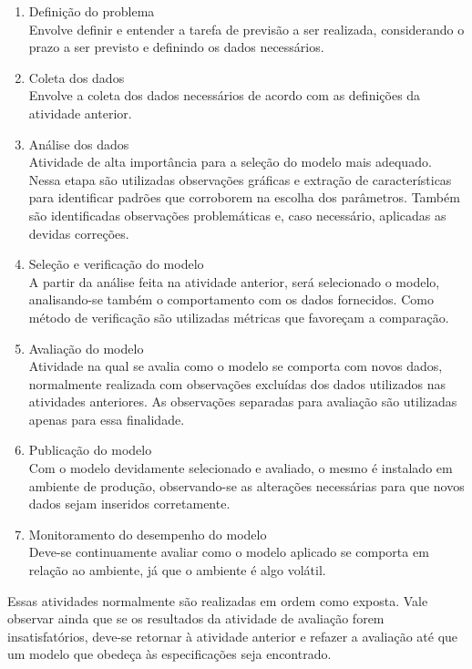\documentclass[
    12pt,
    oneside,
    a4paper,
    english,
    brazil
]{abntex2}
\begin{document}
\begin{enumerate}
    \item Definição do problema\\
        Envolve  definir e  entender  a  tarefa de  previsão  a ser  realizada,
        considerando o prazo a ser previsto e definindo os dados necessários.
    \item Coleta dos dados\\
        Envolve a coleta  dos dados necessários de acordo com  as definições da
        atividade anterior.
    \item Análise dos dados\\
        Atividade de alta  importância para a seleção do  modelo mais adequado.
        Nessa  etapa   são  utilizadas  observações  gráficas   e  extração  de
        características para identificar padrões  que corroborem na escolha dos
        parâmetros. Também são identificadas  observações problemáticas e, caso
        necessário, aplicadas as devidas correções.
    \item Seleção e verificação do modelo\\
        A partir  da análise  feita na atividade  anterior, será  selecionado o
        modelo, analisando-se  também o comportamento com  os dados fornecidos.
        Como  método de  verificação são  utilizadas métricas  que favoreçam  a
        comparação.
    \item Avaliação do modelo\\
        Atividade na qual se avalia como  o modelo se comporta com novos dados,
        normalmente realizada  com observações  excluídas dos  dados utilizados
        nas atividades anteriores. As  observações separadas para avaliação são
        utilizadas apenas para essa finalidade.
    \item Publicação do modelo\\
        Com o modelo devidamente selecionado e avaliado, o mesmo é instalado em
        ambiente de produção, observando-se  as alterações necessárias para que
        novos dados sejam inseridos corretamente.
    \item Monitoramento do desempenho do modelo\\
        Deve-se continuamente  avaliar como  o modelo  aplicado se  comporta em
        relação ao ambiente, já que o ambiente é algo volátil.
\end{enumerate}

Essas  atividades  normalmente  são  realizadas em  ordem  como  exposta.  Vale
observar  ainda  que   se  os  resultados  da  atividade   de  avaliação  forem
insatisfatórios, deve-se  retornar à atividade  anterior e refazer  a avaliação
até que um modelo que obedeça às especificações seja encontrado.
\end{document}
